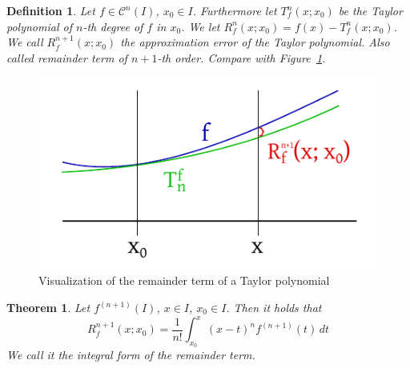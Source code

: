 \documentclass{article}
\newtheorem{theorem}{Theorem}  \numberwithin{theorem}{section}
\newtheorem{definition}{Definition}  \numberwithin{definition}{section}
\begin{document}
\begin{definition} %
  \label{def4}
  Let $f \in \mathcal C^n(I)$, $x_0 \in I$. Furthermore let $T_f^n(x; x_0)$ be the Taylor polynomial of $n$-th degree of $f$ in $x_0$.
  We let $R_f^n(x; x_0) = f(x) - T_f^n(x; x_0)$. We call $R_f^{n+1}(x; x_0)$ the \emph{approximation error} of the Taylor polynomial.
  Also called \emph{remainder term of $n+1$-th order}. Compare with Figure~\ref{img:taylor-rem}.
\end{definition}

\begin{figure}[t]
  \begin{center}
    \includegraphics{img/27_taylor_remainder.pdf}
    \caption{Visualization of the remainder term of a Taylor polynomial}
    \label{img:taylor-rem}
  \end{center}
\end{figure}

\begin{theorem} %
  \label{thm4} 
  Let $f^{(n+1)}(I)$, $x \in I$, $x_0 \in I$. Then it holds that
  \[ R_f^{n+1}(x; x_0) = \frac1{n!} \int_{x_0}^x (x - t)^n f^{(n+1)}(t) \, dt \]
  We call it the \emph{integral form of the remainder term}.
\end{theorem}
\end{document}
